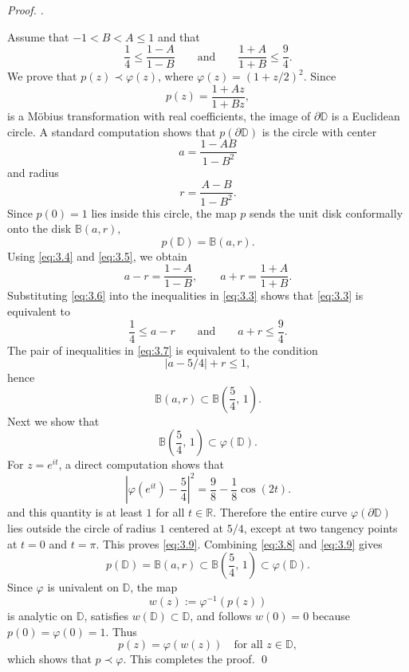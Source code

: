 \documentclass[a4paper,12pt,reqno]{amsart} %
\numberwithin{equation}{section}
\theoremstyle{definition}
\newenvironment{pf}[1][]{%
	\vskip 3mm
	\noindent
	\ifthenelse{\equal{#1}{}}%
	{{\slshape Proof. }}%
	{{\slshape #1.} }%
}%
{\qed\bigskip}
\begin{document}
\begin{pf}
Assume that $-1 < B < A \le 1$ and that
\begin{equation}\label{eq:3.3}
\frac{1}{4} \le \frac{1-A}{1-B}
\qquad\text{and}\qquad
\frac{1+A}{1+B} \le \frac{9}{4}.
\end{equation}
We prove that $p(z) \prec \varphi(z)$, where $\varphi(z) = (1+z/2)^2$.
\medskip
Since
\[
p(z) = \frac{1+Az}{1+Bz},
\]
is a Möbius transformation with real coefficients, the image of $\partial\mathbb D$
is a Euclidean circle. A standard computation shows that $p(\partial\mathbb D)$
is the circle with center
\begin{equation}\label{eq:3.4}
a = \frac{1-AB}{1-B^2}
\end{equation}
and radius
\begin{equation}\label{eq:3.5}
r = \frac{A-B}{1-B^2}.
\end{equation}
Since $p(0)=1$ lies inside this circle, the map $p$ sends the unit disk conformally onto
the disk $\mathbb B(a,r),$
\[
p(\mathbb D) = \mathbb B(a,r).
\]
Using \eqref{eq:3.4} and \eqref{eq:3.5}, we obtain
\begin{equation}\label{eq:3.6}
a-r = \frac{1-A}{1-B},
\qquad
a+r = \frac{1+A}{1+B}.
\end{equation}
Substituting \eqref{eq:3.6} into the inequalities in \eqref{eq:3.3} shows that
\eqref{eq:3.3} is equivalent to
\begin{equation}\label{eq:3.7}
\frac14 \le a-r
\qquad\text{and}\qquad
a+r \le \frac94.
\end{equation}
The pair of inequalities in \eqref{eq:3.7} is equivalent to the condition
\[
|a - 5/4| + r \le 1,
\]
hence
\begin{equation}\label{eq:3.8}
\mathbb B(a,r) \subset \mathbb B\!\left(\frac54,\,1\right).
\end{equation}
\medskip
Next we show that
\begin{equation}\label{eq:3.9}
\mathbb B\!\left(\frac54,\,1\right) \subset \varphi(\mathbb D).
\end{equation}
For $z=e^{it}$, a direct computation shows that
\[
\left|\varphi(e^{it}) - \frac54\right|^2
= \frac{9}{8} - \frac{1}{8}\cos(2t).
\]
and this quantity is at least $1$ for all $t\in\mathbb R$. Therefore the entire
curve $\varphi(\partial\mathbb D)$ lies outside the circle of radius $1$
centered at $5/4$, except at two tangency points at $t=0$ and $t=\pi$. This proves \eqref{eq:3.9}.
\medskip
Combining \eqref{eq:3.8} and \eqref{eq:3.9} gives
\[
p(\mathbb D) = \mathbb B(a,r) \subset \mathbb B\!\left(\frac54,\,1\right)
\subset \varphi(\mathbb D).
\]
Since $\varphi$ is univalent on $\mathbb D$, the map
\[
w(z) := \varphi^{-1}(p(z))
\]
is analytic on $\mathbb D$, satisfies $w(\mathbb D)\subset\mathbb D$,
and follows $w(0)=0$ because $p(0)=\varphi(0)=1$.
Thus
\[
p(z) = \varphi(w(z)) \quad \mbox{for all } z\in\mathbb D,
\]
which shows that $p \prec \varphi$.
\medskip
This completes the proof.
\end{pf}\\
\end{document}

